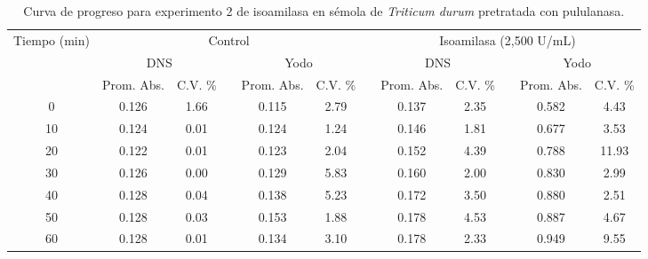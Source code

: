 \documentclass{article}
\begin{document}
\begin{table}[H]
	\centering
	\caption{Curva de progreso para experimento 2 de isoamilasa en sémola de \textit{Triticum durum} pretratada con pululanasa.}
		\begin{adjustbox}{width=\textwidth}
	\begin{tabular}{cccccccccccc}
		\toprule
		\multicolumn{1}{c}{\multirow{3}[6]{*}{Tiempo (min)}} & \multicolumn{5}{c}{Control}           &       & \multicolumn{5}{c}{Isoamilasa (2,500 U/mL)} \\
		\cmidrule{2-6}\cmidrule{8-12}          & \multicolumn{2}{c}{DNS} &       & \multicolumn{2}{c}{Yodo} &       & \multicolumn{2}{c}{DNS} &       & \multicolumn{2}{c}{Yodo} \\
		\cmidrule{2-3}\cmidrule{5-6}\cmidrule{8-9}\cmidrule{11-12}          & Prom. Abs. & C.V. \% &       & Prom. Abs. & C.V. \% &       & Prom. Abs. & C.V. \% &       & Prom. Abs. & C.V. \% \\
		\midrule
		0     & 0.126 & 1.66  &       & 0.115 & 2.79  &       & 0.137 & 2.35  &       & 0.582 & 4.43 \\
		10    & 0.124 & 0.01  &       & 0.124 & 1.24  &       & 0.146 & 1.81  &       & 0.677 & 3.53 \\
		20    & 0.122 & 0.01  &       & 0.123 & 2.04  &       & 0.152 & 4.39  &       & 0.788 & 11.93 \\
		30    & 0.126 & 0.00  &       & 0.129 & 5.83  &       & 0.160 & 2.00  &       & 0.830 & 2.99 \\
		40    & 0.128 & 0.04  &       & 0.138 & 5.23  &       & 0.172 & 3.50  &       & 0.880 & 2.51 \\
		50    & 0.128 & 0.03  &       & 0.153 & 1.88  &       & 0.178 & 4.53  &       & 0.887 & 4.67 \\
		60    & 0.128 & 0.01  &       & 0.134 & 3.10  &       & 0.178 & 2.33  &       & 0.949 & 9.55 \\
		\bottomrule
	\end{tabular}%
	\end{adjustbox}
	\label{tab:e2.2}%
\end{table}%
\end{document}
